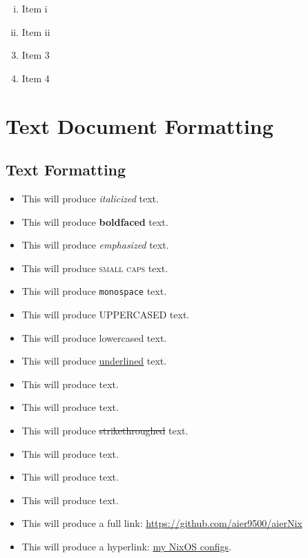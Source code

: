 \documentclass[12pt]{article}
\begin{document}
\begin{enumerate}[i)]
    \item Item i
    \item Item ii
\end{enumerate} \vspace{10pt}

\begin{enumerate} \setcounter{enumi}{2}
    \item Item 3
    \item Item 4
\end{enumerate} \vspace{10pt}


\section{Text Document Formatting}
\subsection{Text Formatting}

\begin{itemize}
    \item This will produce \textit{italicized} text.
    \item This will produce \textbf{boldfaced} text.
    \item This will produce \emph{emphasized} text. %
    \item This will produce \textsc{small caps} text.
    \item This will produce \texttt{monospace} text. 
    \item This will produce \MakeTextUppercase{uppercased} text.
    \item This will produce \MakeTextLowercase{LOWERCASED} text. 
    \item This will produce \uline{underlined} text. 
    \item This will produce  text.
    \item This will produce  text. 
    \item This will produce \sout{strikethroughed} text. 
    \item This will produce  text. 
    \item This will produce  text.
    \item This will produce  text. 
    \item This will produce a full link: \url{https://github.com/aier9500/aierNix}
    \item This will produce a hyperlink: \href{https://github.com/aier9500/aierNix}{my NixOS configs}.
\end{itemize} \vspace{10pt}
\end{document}
